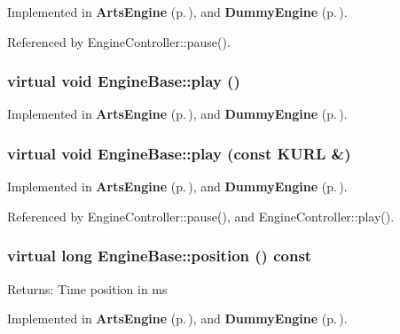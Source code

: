 Implemented in {\bf Arts\-Engine} {\rm (p.\,\pageref{classArtsEngine_ArtsEnginei3})}, and {\bf Dummy\-Engine} {\rm (p.\,\pageref{classDummyEngine_DummyEngined10})}.

Referenced by Engine\-Controller::pause().
\subsubsection{\setlength{\rightskip}{0pt plus 5cm}virtual void Engine\-Base::play ()\hspace{0.3cm}{\tt  [pure virtual, slot]}}\label{classEngineBase_EngineBasei1}




Implemented in {\bf Arts\-Engine} {\rm (p.\,\pageref{classArtsEngine_ArtsEnginei1})}, and {\bf Dummy\-Engine} {\rm (p.\,\pageref{classDummyEngine_DummyEngined8})}.
\subsubsection{\setlength{\rightskip}{0pt plus 5cm}virtual void Engine\-Base::play (const KURL \&)\hspace{0.3cm}{\tt  [pure virtual, slot]}}\label{classEngineBase_EngineBasei0}




Implemented in {\bf Arts\-Engine} {\rm (p.\,\pageref{classArtsEngine_ArtsEnginei0})}, and {\bf Dummy\-Engine} {\rm (p.\,\pageref{classDummyEngine_DummyEngined7})}.

Referenced by Engine\-Controller::pause(), and Engine\-Controller::play().
\subsubsection{\setlength{\rightskip}{0pt plus 5cm}virtual long Engine\-Base::position () const\hspace{0.3cm}{\tt  [pure virtual]}}\label{classEngineBase_EngineBasea7}


\begin{Desc}
\item[Returns:]Time position in ms \end{Desc}


Implemented in {\bf Arts\-Engine} {\rm (p.\,\pageref{classArtsEngine_ArtsEnginea6})}, and {\bf Dummy\-Engine} {\rm (p.\,\pageref{classDummyEngine_DummyEngined4})}.

